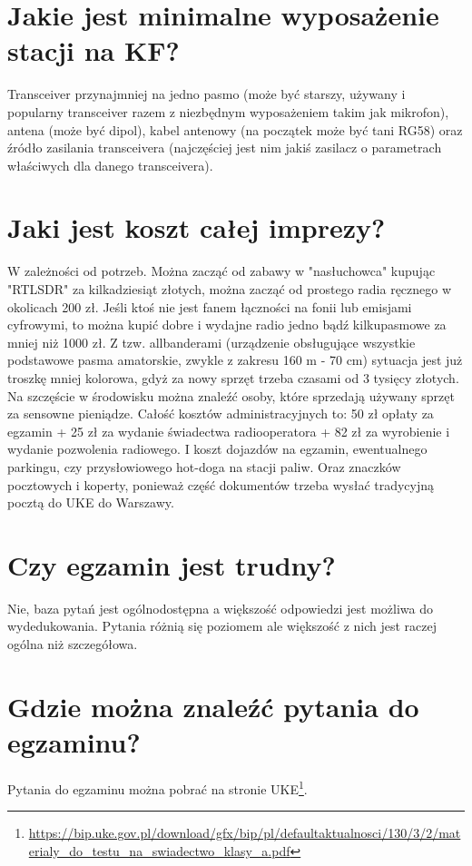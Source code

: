 \documentclass[a4paper,12pt]{article}
\begin{document}
\section{Jakie jest minimalne wyposażenie stacji na KF?}
Transceiver przynajmniej na jedno pasmo (może być starszy, używany i popularny transceiver razem z niezbędnym wyposażeniem takim jak mikrofon), antena (może być dipol), kabel antenowy (na początek może być tani RG58) oraz źródło zasilania transceivera (najczęściej jest nim jakiś zasilacz o parametrach właściwych dla danego transceivera).

\section{Jaki jest koszt całej imprezy?}
W zależności od potrzeb. Można zacząć od zabawy w "nasłuchowca" kupując "RTLSDR" za kilkadziesiąt złotych, można zacząć od prostego radia ręcznego w okolicach 200 zł. Jeśli ktoś nie jest fanem łączności na fonii lub emisjami cyfrowymi, to można kupić dobre i wydajne radio jedno bądź kilkupasmowe za mniej niż 1000 zł. Z tzw. allbanderami (urządzenie obsługujące wszystkie podstawowe pasma amatorskie, zwykle z zakresu 160 m - 70 cm) sytuacja jest już troszkę mniej kolorowa, gdyż za nowy sprzęt trzeba czasami od 3 tysięcy złotych. Na szczęście w środowisku można znaleźć osoby, które sprzedają używany sprzęt za sensowne pieniądze.
Całość kosztów administracyjnych to: 50 zł opłaty za egzamin + 25 zł za wydanie świadectwa radiooperatora + 82 zł za wyrobienie i wydanie pozwolenia radiowego. I koszt dojazdów na egzamin, ewentualnego parkingu, czy przysłowiowego hot-doga na stacji paliw. Oraz znaczków pocztowych i koperty, ponieważ część dokumentów trzeba wysłać tradycyjną pocztą do UKE do Warszawy.

\section{Czy egzamin jest trudny?}
Nie, baza pytań jest ogólnodostępna a większość odpowiedzi jest możliwa do wydedukowania. Pytania różnią się poziomem ale większość z nich jest raczej ogólna niż szczegółowa.

\section{Gdzie można znaleźć pytania do egzaminu?}
Pytania do egzaminu można pobrać na stronie UKE\footnote{\url{https://bip.uke.gov.pl/download/gfx/bip/pl/defaultaktualnosci/130/3/2/materialy_do_testu_na_swiadectwo_klasy_a.pdf}}.
\end{document}

